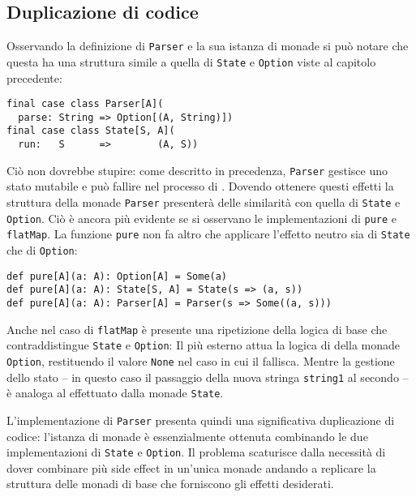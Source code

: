 \subsection{Duplicazione di codice}
Osservando la definizione di \lstinline{Parser} e la sua istanza di monade si può notare che questa ha una struttura simile a quella di \lstinline{State} e \lstinline{Option} viste al capitolo precedente:
\begin{lstlisting}[language=scala3]
final case class Parser[A](
  parse: String => Option[(A, String)])
final case class State[S, A](
  run:   S      =>        (A, S))
\end{lstlisting}
Ciò non dovrebbe stupire: come descritto in precedenza, \lstinline{Parser} gestisce uno stato mutabile e può fallire nel processo di . Dovendo ottenere questi effetti la struttura della monade \lstinline{Parser} presenterà delle similarità con quella di \lstinline{State} e \lstinline{Option}. Ciò è ancora più evidente se si osservano le implementazioni di \lstinline{pure} e \lstinline{flatMap}. La funzione \lstinline{pure} non fa altro che applicare l'effetto neutro sia di \lstinline{State} che di \lstinline{Option}:
\begin{lstlisting}[language=scala3]
def pure[A](a: A): Option[A] = Some(a)
def pure[A](a: A): State[S, A] = State(s => (a, s))
def pure[A](a: A): Parser[A] = Parser(s => Some((a, s)))
\end{lstlisting}
Anche nel caso di \lstinline{flatMap} è presente una ripetizione della logica di base che contraddistingue \lstinline{State} e \lstinline{Option}:
Il  più esterno attua la logica di  della monade \lstinline{Option}, restituendo il valore \lstinline{None} nel caso in cui il  fallisca. Mentre la gestione dello stato -- in questo caso il passaggio della nuova stringa \lstinline{string1} al secondo  -- è analoga al  effettuato dalla monade \lstinline{State}.

L'implementazione di \lstinline{Parser} presenta quindi una significativa duplicazione di codice: l'istanza di monade è essenzialmente ottenuta combinando le due implementazioni di \lstinline{State} e \lstinline{Option}. Il problema scaturisce dalla necessità di dover combinare più side effect in un'unica monade andando a replicare la struttura delle monadi di base che forniscono gli effetti desiderati.

